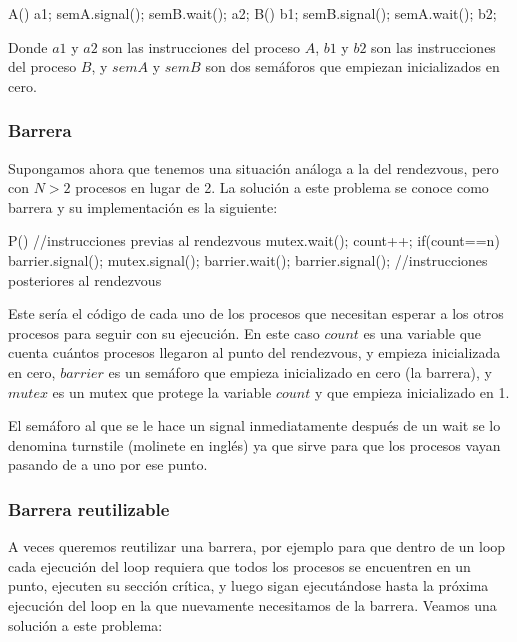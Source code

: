 \documentclass{article}
\begin{document}
\begin{code}
A()
{
    a1;
		semA.signal();
		semB.wait();
		a2;
}
B()
{
    b1;
		semB.signal();
		semA.wait();
		b2;
}
\end{code}

Donde $a1$ y $a2$ son las instrucciones del proceso $A$, $b1$ y $b2$ son las instrucciones del proceso $B$, y $semA$ y $semB$ son dos sem\'aforos que empiezan inicializados en cero.

\subsubsection{Barrera}

Supongamos ahora que tenemos una situaci\'on an\'aloga a la del rendezvous, pero con $N > 2$ procesos en lugar de 2. La soluci\'on a este problema se conoce como barrera y su implementaci\'on es la siguiente:

\begin{code}
P()
{
    //instrucciones previas al rendezvous
    mutex.wait();
		    count++;
				if(count==n)
				    barrier.signal();
		mutex.signal();
		barrier.wait();
		barrier.signal();
		//instrucciones posteriores al rendezvous
}
\end{code}

Este ser\'ia el c\'odigo de cada uno de los procesos que necesitan esperar a los otros procesos para seguir con su ejecuci\'on. En este caso $count$ es una variable que cuenta cu\'antos procesos llegaron al punto del rendezvous, y empieza inicializada en cero, $barrier$ es un sem\'aforo que empieza inicializado en cero (la barrera), y $mutex$ es un mutex que protege la variable $count$ y que empieza inicializado en 1.

El sem\'aforo al que se le hace un signal inmediatamente despu\'es de un wait se lo denomina turnstile (molinete en ingl\'es) ya que sirve para que los procesos vayan pasando de a uno por ese punto.

\subsubsection{Barrera reutilizable}

A veces queremos reutilizar una barrera, por ejemplo para que dentro de un loop cada ejecuci\'on del loop requiera que todos los procesos se encuentren en un punto, ejecuten su secci\'on cr\'itica, y luego sigan ejecut\'andose hasta la pr\'oxima ejecuci\'on del loop en la que nuevamente necesitamos de la barrera. Veamos una soluci\'on a este problema:
\end{document}
